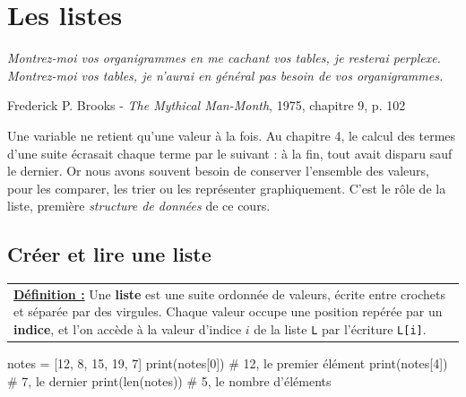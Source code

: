 \documentclass[a4paper,11pt,openany]{book}
\newcommand{\mot}[1]{\textcolor{rougecours}{\textbf{#1}}}
\newcommand{\code}[1]{\texttt{\textcolor{codebleu}{#1}}}
\newcommand{\epigraphe}[2]{%
  \begin{list}{}{\leftmargin=1cm \rightmargin=1cm}\item[]
  \small\textit{#1}
  \end{list}
  \nopagebreak
  \hfill\small #2 \par\vspace{4mm}}
\begin{document}
\chapter{Les listes}

\epigraphe{Montrez-moi vos organigrammes en me cachant vos tables, je resterai perplexe. Montrez-moi vos tables, je n'aurai en général pas besoin de vos organigrammes.}{Frederick P. Brooks - \emph{The Mythical Man-Month}, 1975, chapitre 9, p. 102}

Une variable ne retient qu'une valeur à la fois. Au chapitre 4, le calcul des termes d'une suite écrasait chaque terme par le suivant : à la fin, tout avait disparu sauf le dernier. Or nous avons souvent besoin de conserver l'ensemble des valeurs, pour les comparer, les trier ou les représenter graphiquement. C'est le rôle de la liste, première \emph{structure de données} de ce cours.

\section{Créer et lire une liste}

\begin{center}
\begin{tabularx}{15cm}{||X}
\noindent \textbf{\underline{Définition :}} Une \mot{liste} est une suite ordonnée de valeurs, écrite entre crochets et séparée par des virgules. Chaque valeur occupe une position repérée par un \mot{indice}, et l'on accède à la valeur d'indice $i$ de la liste \code{L} par l'écriture \code{L[i]}.
\end{tabularx}
\end{center}

\begin{python}
notes = [12, 8, 15, 19, 7]
print(notes[0])     # 12, le premier élément
print(notes[4])     # 7, le dernier
print(len(notes))   # 5, le nombre d'éléments
\end{python}

\begin{center}
\end{center}
\end{document}

